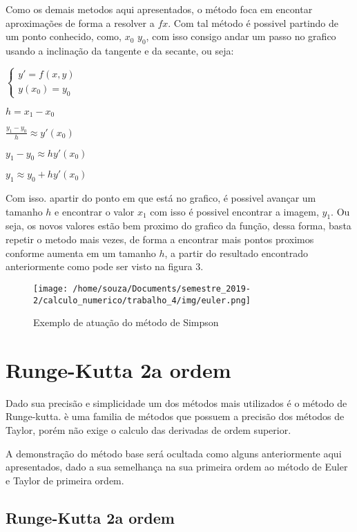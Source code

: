 \documentclass[12pt]{article}
\begin{document}
Como os demais metodos aqui apresentados, o método foca em encontar aproximações de forma a resolver a $fx$. Com tal método é possivel partindo de um ponto conhecido, como, $x_{0}$ $y_{0}$, com isso consigo andar um passo no grafico usando a inclinação da tangente e da secante, ou seja:

$\left \{ \begin{matrix} y' = f(x,y) & \mbox{ }\mbox{ }\\ y(x_{0}) = y_{0} & \mbox{ }\mbox{} \end{matrix} \right.$ 


$h = x_{1} - x_{0}$

$\frac{y_{1} - y_{0}}{h} \approx y'(x_{0})$

$y_{1} - y_{0} \approx hy'(x_{0})$

$y_{1} \approx y_{0} + hy'(x_{0})$

Com isso. apartir do ponto em que está no grafico, é possivel avançar um tamanho $h$ e encontrar o valor $x_{1}$ com isso é possivel encontrar a imagem, $y_{1}$. Ou seja, os novos valores estão bem proximo do grafico da função, dessa forma, basta repetir o metodo mais vezes, de forma a encontrar mais pontos proximos conforme aumenta em um tamanho $h$, a partir do resultado encontrado anteriormente como pode ser visto na figura 3.

\begin{figure}[!h]
    \centering
    \texttt{[image: /home/souza/Documents/semestre\_2019-2/calculo\_numerico/trabalho\_4/img/euler.png]}
    \caption{Exemplo de atuação do método de Simpson}
\end{figure}

\section{Runge-Kutta 2a ordem}
Dado sua precisão e simplicidade um dos métodos mais utilizados é o método de Runge-kutta. è uma familia de métodos que possuem a precisão dos métodos de Taylor, porém não exige o calculo das derivadas de ordem superior.

A demonstração do método base será ocultada como alguns anteriormente aqui apresentados, dado a sua semelhança na sua primeira ordem ao método de Euler e Taylor de primeira ordem.

\subsection{Runge-Kutta 2a ordem}
\end{document}
